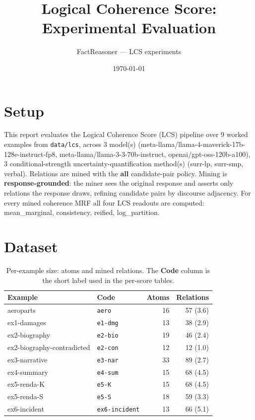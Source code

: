 \documentclass[11pt]{article}
\title{Logical Coherence Score: Experimental Evaluation}
\author{FactReasoner --- LCS experiments}
\date{\today}
\begin{document}
\maketitle

\section{Setup}

This report evaluates the Logical Coherence Score (LCS) pipeline over 9 worked examples from \texttt{data/lcs}, across 3 model(s) (meta-llama/llama-4-maverick-17b-128e-instruct-fp8, meta-llama/llama-3-3-70b-instruct, openai/gpt-oss-120b-a100), 3 conditional-strength uncertainty-quantification method(s) (surr-lp, surr-smp, verbal). Relations are mined with the \textbf{all} candidate-pair policy. Mining is \textbf{response-grounded}: the miner sees the original response and asserts only relations the response draws, refining candidate pairs by discourse adjacency. For every mined coherence MRF all four LCS readouts are computed: mean\_marginal, consistency, reified, log\_partition. 

\section{Dataset}

\begin{table}[htbp]
\centering
\small
\caption{Per-example size: atoms and mined relations. The \textbf{Code} column is the short label used in the per-score tables.}
\label{tab:coverage}
\begin{tabular}{llrr}
\toprule
Example & Code & Atoms & Relations \\
\midrule
aeroparts & \texttt{aero} & 16 & 57 (3.6) \\
ex1-damages & \texttt{e1-dmg} & 13 & 38 (2.9) \\
ex2-biography & \texttt{e2-bio} & 19 & 46 (2.4) \\
ex2-biography-contradicted & \texttt{e2-con} & 12 & 12 (1.0) \\
ex3-narrative & \texttt{e3-nar} & 33 & 89 (2.7) \\
ex4-summary & \texttt{e4-sum} & 15 & 68 (4.5) \\
ex5-renda-K & \texttt{e5-K} & 15 & 68 (4.5) \\
ex5-renda-S & \texttt{e5-S} & 18 & 59 (3.3) \\
ex6-incident & \texttt{ex6-incident} & 13 & 66 (5.1) \\
\bottomrule
\end{tabular}
\end{table}
\end{document}

